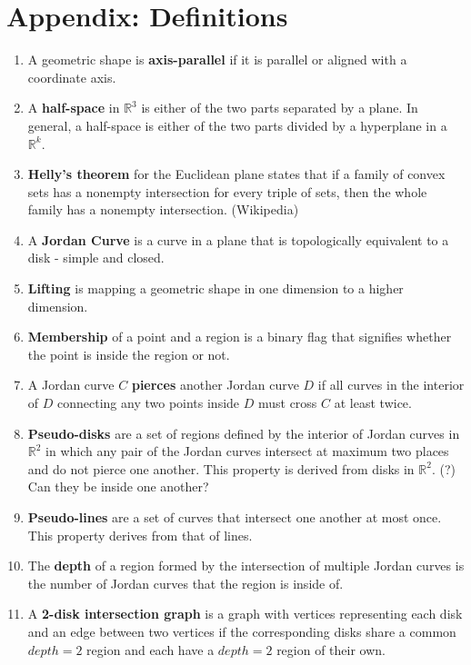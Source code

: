 \documentclass{NSF}
\begin{document}
\section{Appendix: Definitions}
\begin{enumerate}
\item A geometric shape is \textbf{axis-parallel} if it is parallel or aligned with a coordinate axis.
\item A \textbf{half-space} in $\mathbb{R}^3$ is either of the two parts separated by a plane. In general, a half-space is either of the two parts divided by a hyperplane in a $\mathbb{R}^k$.
\item \textbf{Helly's theorem} for the Euclidean plane states that if a family of convex sets has a nonempty intersection for every triple of sets, then the whole family has a nonempty intersection. (Wikipedia)
\item A \textbf{Jordan Curve} is a curve in a plane that is topologically equivalent to a disk - simple and closed.
\item \textbf{Lifting} is mapping a geometric shape in one dimension to a higher dimension.
\item \textbf{Membership} of a point and a region is a binary flag that signifies whether the point is inside the region or not.
\item A Jordan curve $C$ \textbf{pierces} another Jordan curve $D$ if all curves in the interior of $D$ connecting any two points inside $D$ must cross $C$ at least twice.
\item \textbf{Pseudo-disks} are a set of regions defined by the interior of Jordan curves in $\mathbb{R}^2$ in which any pair of the Jordan curves intersect at maximum two places and do not pierce one another. This property is derived from disks in $\mathbb{R}^2$. (?) Can they be inside one another?
\item \textbf{Pseudo-lines} are a set of curves that intersect one another at most once. This property derives from that of lines.
\item The \textbf{depth} of a region formed by the intersection of multiple Jordan curves is the number of Jordan curves that the region is inside of.
\item A \textbf{2-disk intersection graph} is a graph with vertices representing each disk and an edge between two vertices if the corresponding disks share a common $depth=2$ region and each have a $depth=2$ region of their own.

\end{enumerate}



\renewcommand\refname{References}


\end{document}
